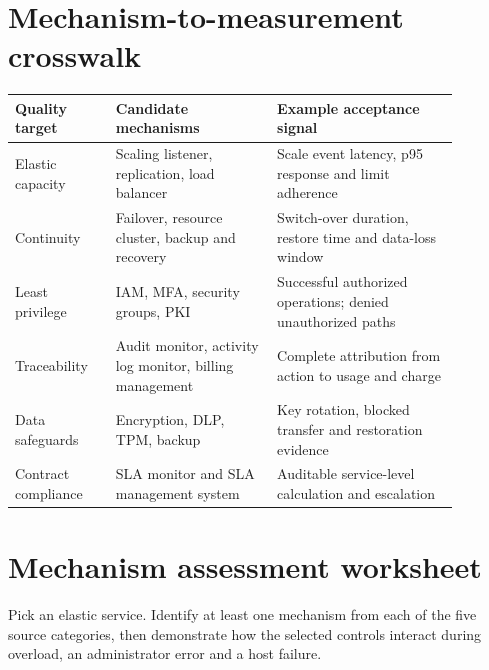 \documentclass[10pt,letterpaper]{article}
\begin{document}
\section{Mechanism-to-measurement crosswalk}
\small\begin{longtable}{p{0.20\linewidth}p{0.32\linewidth}p{0.36\linewidth}}
\toprule Quality target & Candidate mechanisms & Example acceptance signal \\\midrule
Elastic capacity & Scaling listener, replication, load balancer & Scale event latency, p95 response and limit adherence \\
Continuity & Failover, resource cluster, backup and recovery & Switch-over duration, restore time and data-loss window \\
Least privilege & IAM, MFA, security groups, PKI & Successful authorized operations; denied unauthorized paths \\
Traceability & Audit monitor, activity log monitor, billing management & Complete attribution from action to usage and charge \\
Data safeguards & Encryption, DLP, TPM, backup & Key rotation, blocked transfer and restoration evidence \\
Contract compliance & SLA monitor and SLA management system & Auditable service-level calculation and escalation \\\bottomrule
\end{longtable}\normalsize
\section{Mechanism assessment worksheet}
\begin{workbox}[title={Evaluation task}]
Pick an elastic service. Identify at least one mechanism from each of the five source categories, then demonstrate how the selected controls interact during overload, an administrator error and a host failure.
\end{workbox}

\end{document}
